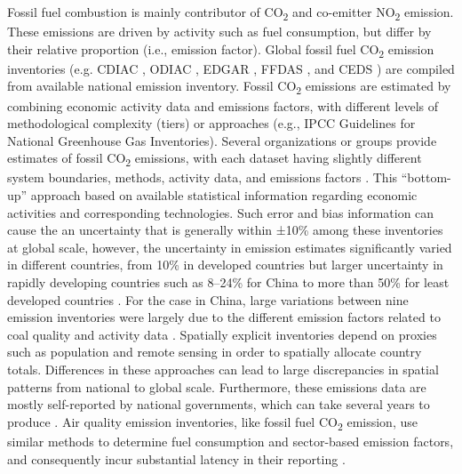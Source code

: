 Fossil fuel combustion is mainly contributor of CO\textsubscript{2} and co-emitter NO\textsubscript{2} emission. These emissions are driven by activity such as fuel consumption, but differ by their relative proportion (i.e., emission factor)\citep{miyazaki2023predictability}. Global fossil fuel CO\textsubscript{2} emission inventories (e.g.  CDIAC \citep{andres2012synthesis}, ODIAC \citep{oda2011very, oda2018open}, EDGAR \citep{crippa2020high}, FFDAS \citep{asefi2014multiyear}, and CEDS \citep{hoesly2018historical}) are compiled from available national emission inventory. Fossil CO\textsubscript{2} emissions are estimated by combining economic activity data and emissions factors, with different levels of methodological complexity (tiers) or approaches (e.g., IPCC Guidelines for National Greenhouse Gas Inventories). Several organizations or groups provide estimates of fossil CO\textsubscript{2} emissions, with each dataset having slightly different system boundaries, methods, activity data, and emissions factors \citep{andrew2020comparison}. This “bottom-up” approach based on available statistical information regarding economic activities and corresponding technologies. Such error and bias information can cause the an uncertainty that is generally within ±10\% among these inventories at global scale, however, the uncertainty in emission estimates significantly varied in different countries, from 10\% in developed countries\citep{essd-11-1783-2019} but larger uncertainty in rapidly developing countries such as 8–24\% for China \citep{han2020evaluating, marland2008uncertainties} to more than 50\% for least developed countries \citep{andres2016gridded, essd-11-1783-2019, oda2018open}. For the case in China, large variations between nine emission inventories were largely due to the different emission factors related to coal quality and activity data \citep{han2020evaluating,miyazaki2023predictability}. Spatially explicit inventories depend on proxies such as population and remote sensing in order to spatially allocate country totals. Differences in these approaches can lead to large discrepancies in spatial patterns from national to global scale. Furthermore, these emissions data are mostly self-reported by national governments, which can take several years to produce \citep{marland2008uncertainties}. Air quality emission inventories, like fossil fuel CO\textsubscript{2} emission, use similar methods to determine fuel consumption and sector-based emission factors, and consequently incur substantial latency in their reporting \citep{miyazaki2023predictability}.\par

